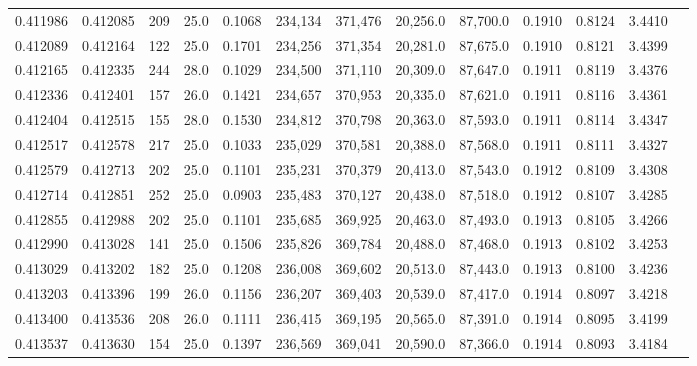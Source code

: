 \begin{tabular}{rrrrrrrrrrrrr}
0.411986 & 0.412085 &   209 & 25.0 &                                     0.1068 & 234,134 & 371,476 &  20,256.0 &  87,700.0 & 0.1910 & 0.8124 & 3.4410 \\
0.412089 & 0.412164 &   122 & 25.0 &                                     0.1701 & 234,256 & 371,354 &  20,281.0 &  87,675.0 & 0.1910 & 0.8121 & 3.4399 \\
0.412165 & 0.412335 &   244 & 28.0 &                                     0.1029 & 234,500 & 371,110 &  20,309.0 &  87,647.0 & 0.1911 & 0.8119 & 3.4376 \\
0.412336 & 0.412401 &   157 & 26.0 &                                     0.1421 & 234,657 & 370,953 &  20,335.0 &  87,621.0 & 0.1911 & 0.8116 & 3.4361 \\
0.412404 & 0.412515 &   155 & 28.0 &                                     0.1530 & 234,812 & 370,798 &  20,363.0 &  87,593.0 & 0.1911 & 0.8114 & 3.4347 \\
0.412517 & 0.412578 &   217 & 25.0 &                                     0.1033 & 235,029 & 370,581 &  20,388.0 &  87,568.0 & 0.1911 & 0.8111 & 3.4327 \\
0.412579 & 0.412713 &   202 & 25.0 &                                     0.1101 & 235,231 & 370,379 &  20,413.0 &  87,543.0 & 0.1912 & 0.8109 & 3.4308 \\
0.412714 & 0.412851 &   252 & 25.0 &                                     0.0903 & 235,483 & 370,127 &  20,438.0 &  87,518.0 & 0.1912 & 0.8107 & 3.4285 \\
0.412855 & 0.412988 &   202 & 25.0 &                                     0.1101 & 235,685 & 369,925 &  20,463.0 &  87,493.0 & 0.1913 & 0.8105 & 3.4266 \\
0.412990 & 0.413028 &   141 & 25.0 &                                     0.1506 & 235,826 & 369,784 &  20,488.0 &  87,468.0 & 0.1913 & 0.8102 & 3.4253 \\
0.413029 & 0.413202 &   182 & 25.0 &                                     0.1208 & 236,008 & 369,602 &  20,513.0 &  87,443.0 & 0.1913 & 0.8100 & 3.4236 \\
0.413203 & 0.413396 &   199 & 26.0 &                                     0.1156 & 236,207 & 369,403 &  20,539.0 &  87,417.0 & 0.1914 & 0.8097 & 3.4218 \\
0.413400 & 0.413536 &   208 & 26.0 &                                     0.1111 & 236,415 & 369,195 &  20,565.0 &  87,391.0 & 0.1914 & 0.8095 & 3.4199 \\
0.413537 & 0.413630 &   154 & 25.0 &                                     0.1397 & 236,569 & 369,041 &  20,590.0 &  87,366.0 & 0.1914 & 0.8093 & 3.4184 \\

\end{tabular}
